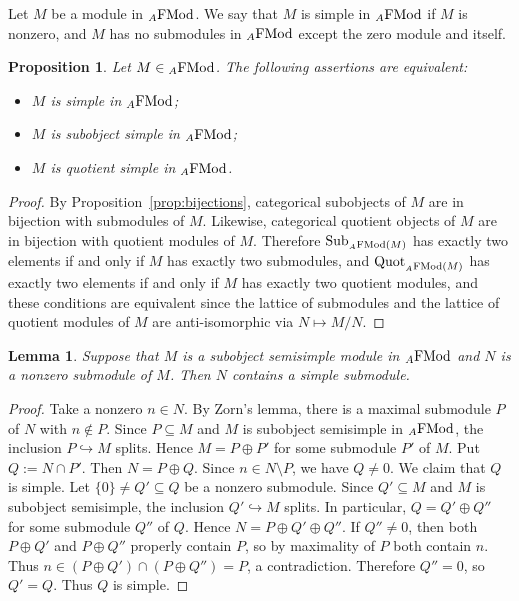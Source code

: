 \documentclass[12pt]{amsart}
\newtheorem{prop}[thm]{Proposition}
\newtheorem{lem}[thm]{Lemma}
\theoremstyle{definition}
\newcommand{\FMod}{{\rm FMod}}
\DeclareMathOperator{\Sub}{Sub}
\DeclareMathOperator{\Quot}{Quot}
\begin{document}
Let $M$ be a module in ${}_A \FMod$.
We say that $M$ is simple 
in ${}_A\FMod$
if $M$ is nonzero, and $M$ has no 
submodules in ${}_A \FMod$
except the zero module and itself.

\begin{prop}
Let $M \in {}_A \FMod$.
The following assertions are equivalent:
\begin{itemize}[widest=(iii)]

\item[{\rm (i)}] $M$ is simple 
in ${}_A\FMod$;

\item[{\rm (ii)}] $M$ is subobject simple
in ${}_A\FMod$;

\item[{\rm (iii)}] $M$ is quotient simple
in ${}_A\FMod$.

\end{itemize}
\end{prop}

\begin{proof}
By Proposition~\ref{prop:bijections}, 
categorical subobjects of $M$ are in bijection with 
submodules of $M$. Likewise, categorical quotient 
objects of $M$ are in bijection with quotient modules 
of $M$. Therefore $\Sub_{{}_A\FMod(M)}$ has exactly 
two elements if and only if $M$ has exactly two submodules, 
and $\Quot_{{}_A\FMod(M)}$ has exactly two elements 
if and only if $M$ has exactly two quotient modules, 
and these conditions are equivalent since the lattice 
of submodules and the lattice of quotient modules of $M$ 
are anti-isomorphic via $N \mapsto M/N$. 
\end{proof}

\begin{lem}\label{lem:simplesubmodule}
Suppose that $M$ is a subobject semisimple
module in ${}_A \FMod$ and $N$ is a nonzero 
submodule of $M$. Then $N$ contains a 
simple submodule.
\end{lem}

\begin{proof}
Take a nonzero $n \in N$. By Zorn's lemma, there is 
a maximal submodule $P$ of $N$ with $n \notin P$.
Since $P \subseteq M$ and $M$ is subobject semisimple in ${}_A\FMod$, the inclusion $P \hookrightarrow M$ splits. Hence
$M = P \oplus P'$
for some submodule $P'$ of $M$. Put
$Q := N \cap P'$.
Then $N = P \oplus Q$.
Since $n \in N \setminus P$, we have $Q \neq 0$.
We claim that $Q$ is simple. Let $\{ 0 \} \neq Q' \subseteq Q$ 
be a nonzero submodule. Since $Q' \subseteq M$ and $M$ is subobject semisimple, the inclusion $Q' \hookrightarrow M$ splits. In particular, $Q = Q' \oplus Q''$
for some submodule $Q''$ of $Q$. Hence
$N = P \oplus Q' \oplus Q''$.
If $Q'' \neq 0$, then both $P \oplus Q'$ and $P \oplus Q''$
properly contain $P$, so by maximality of $P$ 
both contain $n$. Thus
$n \in (P \oplus Q') \cap (P \oplus Q'') = P$,
a contradiction. Therefore $Q''=0$, so $Q'=Q$. 
Thus $Q$ is simple.
\end{proof}
\end{document}
